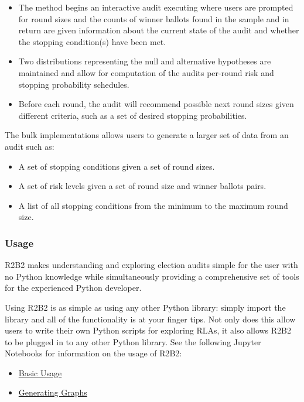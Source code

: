 \begin{itemize}
    \item The  method begins an interactive audit executing where users
    are prompted for round sizes and the counts of winner ballots found in the sample
    and in return are given information about the current state of the audit and whether
    the stopping condition(s) have been met.
    \item Two distributions representing the null and alternative hypotheses are maintained
    and allow for computation of the audits per-round risk and stopping probability
    schedules.
    \item Before each round, the audit will recommend possible next round sizes given
    different criteria, such as a set of desired stopping probabilities.
\end{itemize}
The bulk implementations allows users to generate a larger set of data from an audit
such as:

\begin{itemize}
    \item A set of stopping conditions given a set of round sizes.
    \item A set of risk levels given a set of round size and winner ballots pairs.
    \item A list of all stopping conditions from the minimum to the maximum round size.
\end{itemize}

\subsubsection{Usage}

R2B2 makes understanding and exploring election audits simple for the user with no
Python knowledge while simultaneously providing a comprehensive set of tools for
the experienced Python developer.

Using R2B2 is as simple as using any other Python library: simply import the library
and all of the functionality is at your finger tips. Not only does this allow users
to write their own Python scripts for exploring RLAs, it also allows R2B2 to be plugged
in to any other Python library. See the following Jupyter Notebooks for information on
the usage of R2B2:

\begin{itemize}
    \item \href{https://github.com/gwexploratoryaudits/r2b2/blob/notebooks/notebook/R2B2%20Basics.ipynb}{Basic Usage}
    \item \href{https://github.com/gwexploratoryaudits/r2b2/blob/notebooks/notebook/Generating%20Graphs.ipynb}{Generating Graphs}
\end{itemize}

